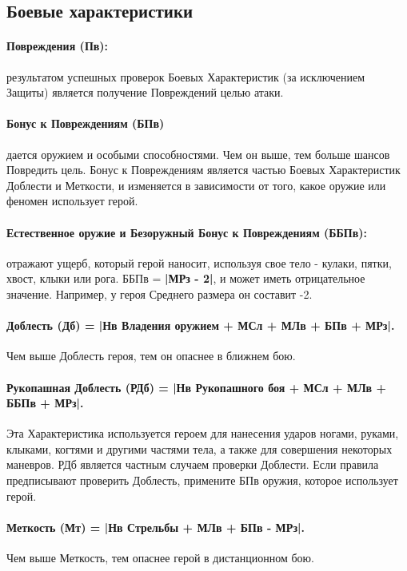 \subsection{Боевые характеристики}
\paragraph{Повреждения (Пв):} результатом успешных проверок Боевых Характеристик (за исключением Защиты) является получение Повреждений целью атаки.
\paragraph{Бонус к Повреждениям (БПв)} дается оружием и особыми способностями. Чем он выше, тем больше шансов Повредить цель. Бонус к Повреждениям является частью Боевых Характеристик Доблести и Меткости, и изменяется в зависимости от того, какое оружие или феномен использует герой.
\paragraph{Естественное оружие и Безоружный Бонус к Повреждениям (ББПв):} отражают ущерб, который герой наносит, используя свое тело - кулаки, пятки, хвост, клыки или рога. ББПв = \textbf{|МРз - 2|}, и может иметь отрицательное значение. Например, у героя Среднего размера он составит -2.
\paragraph{Доблесть (Дб) = |Нв Владения оружием + МСл + МЛв + БПв + МРз|.} Чем выше Доблесть героя, тем он опаснее в ближнем бою.
\paragraph{Рукопашная Доблесть (РДб) = |Нв Рукопашного боя + МСл + МЛв + ББПв + МРз|.} Эта Характеристика используется героем для нанесения ударов ногами, руками, клыками, когтями и другими частями тела, а также для совершения некоторых маневров.
\newline РДб является частным случаем проверки Доблести.
\newline Если правила предписывают проверить Доблесть, примените БПв оружия, которое использует герой.
\paragraph{Меткость (Мт) = |Нв Стрельбы + МЛв + БПв - МРз|.} Чем выше Меткость, тем опаснее герой в дистанционном бою. 
